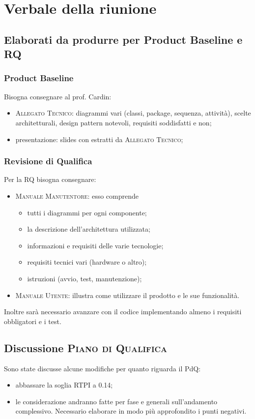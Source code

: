 \section{Verbale della riunione}

\subsection{ Elaborati da produrre per Product Baseline e RQ}
\subsubsection{Product Baseline}
Bisogna consegnare al prof. Cardin:
\begin{itemize}
	\item \textsc{Allegato Tecnico}: diagrammi vari (classi, package, sequenza, attività), scelte architetturali, design pattern notevoli, requisiti soddisfatti e non;
	\item presentazione: slides con estratti da \textsc{Allegato Tecnico};
\end{itemize}

\subsubsection{Revisione di Qualifica}
Per la RQ bisogna consegnare:
\begin{itemize}
	\item \textsc{Manuale Manutentore}: esso comprende 
	\begin{itemize}
		\item tutti i diagrammi per ogni componente;
		\item la descrizione dell'architettura utilizzata;
		\item informazioni e requisiti delle varie tecnologie;
		\item requisiti tecnici vari (hardware o altro);
		\item istruzioni (avvio, test, manutenzione);
	\end{itemize}
	\item \textsc{Manuale Utente}: illustra come utilizzare il prodotto e le sue funzionalità.
\end{itemize}
Inoltre sarà necessario avanzare con il codice implementando almeno i requisiti obbligatori e i test.


\subsection{Discussione \textsc{Piano di Qualifica}}
Sono state discusse alcune modifiche per quanto riguarda il PdQ:
\begin{itemize}
	\item abbassare la soglia RTPI a 0.14;
	\item le considerazione andranno fatte per fase e generali sull'andamento complessivo. Necessario elaborare in modo più approfondito i punti negativi.
\end{itemize}

